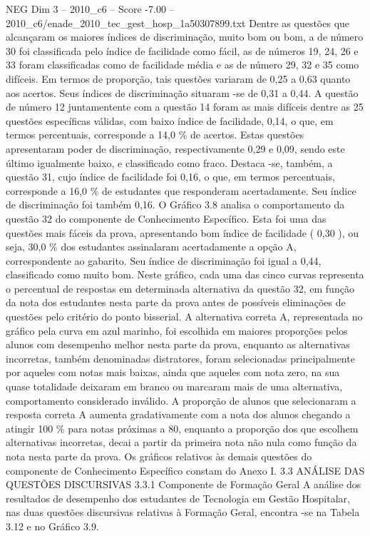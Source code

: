 \begin{textsample}{NEG Dim 3 – 2010\_c6 – Score -7.00 – 2010\_c6/enade\_2010\_tec\_gest\_hosp\_1a50307899.txt}
Dentre as questões que alcançaram os maiores índices de discriminação, muito bom ou bom, a de número 30 foi classificada pelo índice de facilidade como fácil, as de números 19, 24, 26 e 33 foram classificadas como de facilidade média e as de número 29, 32 e 35 como difíceis.
Em termos de proporção, tais questões variaram de 0,25 a 0,63 quanto aos acertos.
Seus índices de discriminação situaram -se de 0,31 a 0,44.
A questão de número 12 juntamentente com a questão 14 foram as mais difíceis dentre as 25 questões específicas válidas, com baixo índice de facilidade, 0,14, o que, em termos percentuais, corresponde a 14,0 \% de acertos.
Estas questões apresentaram poder de discriminação, respectivamente 0,29 e 0,09, sendo este último igualmente baixo, e classificado como fraco.
Destaca -se, também, a questão 31, cujo índice de facilidade foi 0,16, o que, em termos percentuais, corresponde a 16,0 \% de estudantes que responderam acertadamente.
Seu índice de discriminação foi também 0,16.
O Gráfico 3.8 analisa o comportamento da questão 32 do componente de Conhecimento Específico.
Esta foi uma das questões mais fáceis da prova, apresentando bom índice de facilidade ( 0,30 ), ou seja, 30,0 \% dos estudantes assinalaram acertadamente a opção A, correspondente ao gabarito.
Seu índice de discriminação foi igual a 0,44, classificado como muito bom.
Neste gráfico, cada uma das cinco curvas representa o percentual de respostas em determinada alternativa da questão 32, em função da nota dos estudantes nesta parte da prova antes de possíveis eliminações de questões pelo critério do ponto bisserial.
A alternativa correta A, representada no gráfico pela curva em azul marinho, foi escolhida em maiores proporções pelos alunos com desempenho melhor nesta parte da prova, enquanto as alternativas incorretas, também denominadas distratores, foram selecionadas principalmente por aqueles com notas mais baixas, ainda que aqueles com nota zero, na sua quase totalidade deixaram em branco ou marcaram mais de uma alternativa, comportamento considerado inválido.
A proporção de alunos que selecionaram a resposta correta A aumenta gradativamente com a nota dos alunos chegando a atingir 100 \% para notas próximas a 80, enquanto a proporção dos que escolhem alternativas incorretas, decai a partir da primeira nota não nula como função da nota nesta parte da prova.
Os gráficos relativos às demais questões do componente de Conhecimento Específico constam do Anexo I. 3.3 ANÁLISE DAS QUESTÕES DISCURSIVAS 3.3.1 Componente de Formação Geral A análise dos resultados de desempenho dos estudantes de Tecnologia em Gestão Hospitalar, nas duas questões discursivas relativas à Formação Geral, encontra -se na Tabela 3.12 e no Gráfico 3.9.

\end{textsample}
